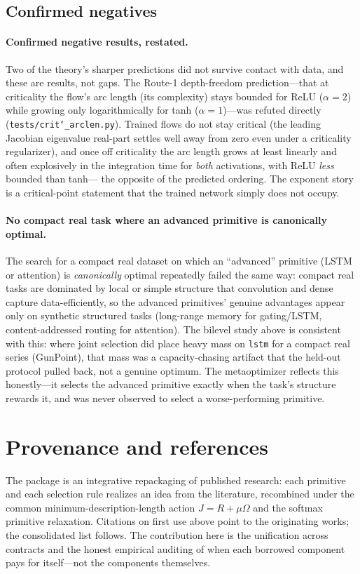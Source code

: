 \documentclass[11pt]{article}
\newcommand{\allowbreakhere}{\discretionary{}{}{}}
\newcommand{\code}[1]{\texttt{\def\_{\char`_\allowbreakhere}#1}}
\begin{document}
\subsection{Confirmed negatives}

\paragraph{Confirmed negative results, restated.} Two of the theory's sharper predictions did not survive
contact with data, and these are results, not gaps. The Route-1 depth-freedom prediction---that at
criticality the flow's arc length (its complexity) stays bounded for ReLU ($\alpha=2$) while growing only
logarithmically for tanh ($\alpha=1$)---was refuted directly (\code{tests/crit\_arclen.py}). Trained flows do
not stay critical (the leading Jacobian eigenvalue real-part settles well away from zero even under a
criticality regularizer), and once off criticality the arc length grows at least linearly and often
explosively in the integration time for \emph{both} activations, with ReLU \emph{less} bounded than tanh---
the opposite of the predicted ordering. The exponent story is a critical-point statement that the trained
network simply does not occupy.

\paragraph{No compact real task where an advanced primitive is canonically optimal.} The
search for a compact real dataset on which an ``advanced'' primitive (LSTM or attention) is
\emph{canonically} optimal repeatedly failed the same way: compact real tasks are dominated by local or
simple structure that convolution and dense capture data-efficiently, so the advanced primitives' genuine
advantages appear only on synthetic structured tasks (long-range memory for gating/LSTM, content-addressed
routing for attention). The bilevel study above is consistent with this: where joint selection did place
heavy mass on \code{lstm} for a compact real series (GunPoint), that mass was a capacity-chasing artifact
that the held-out protocol pulled back, not a genuine optimum. The metaoptimizer reflects this honestly---it
selects the advanced primitive exactly when the task's structure rewards it, and was never observed to
select a worse-performing primitive.


\section{Provenance and references}
\label{sec:refs}
The package is an integrative repackaging of published research: each primitive and each selection rule
realizes an idea from the literature, recombined under the common minimum-description-length action
$J=R+\mu\Omega$ and the softmax primitive relaxation. Citations on first use above point to the originating
works; the consolidated list follows. The contribution here is the unification across contracts and the
honest empirical auditing of when each borrowed component pays for itself---not the components themselves.



\end{document}
